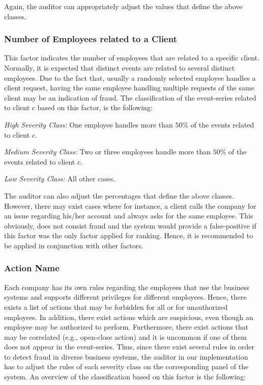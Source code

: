 \documentclass[conference]{IEEEtran}
\begin{document}
Again, the auditor can appropriately adjust the values that define
the above classes.

\subsubsection{Number of Employees related to a Client}

This factor indicates the number of employees that are related to a
specific client. Normally, it is expected that distinct events are
related to several distinct employees. Due to the fact that, usually
a randomly selected employee handles a client request, having the
same employee handling multiple requests of the same client may be
an indication of fraud. The classification of the event-series
related to client $c$ based on this factor, is the following:

\emph{High Severity Class:} One employee handles more than $50\%$ of
the events related to client $c$.

\emph{ Medium Severity Class: }Two or three employees handle more
than $50\%$ of the events related to client $c$.

\emph{Low Severity Class:} All other cases.

The auditor can also adjust the percentages that define the above
classes. However, there may exist cases where for instance, a client
calls the company for an issue regarding his/her account and always
asks for the same employee. This obviously, does not consist fraud
and the system would provide a false-positive if this factor was the
only factor applied for ranking. Hence, it is recommended to be
applied in conjunction with other factors.


\subsubsection{Action Name}

Each company has its own rules regarding the employees that use the
business systems and supports different privileges for different
employees. Hence, there exists a list of actions that may be
forbidden for all or for unauthorized employees. In addition, there
exist actions which are suspicious, even though an employee may be
authorized to perform. Furthermore, there exist actions that may be
correlated (e.g., open-close action) and it is uncommon if one of
them does not appear in the event-series. Thus, since there exist
several rules in order to detect fraud in diverse business systems,
the auditor in our implementation has to adjust the rules of each
severity class on the corresponding panel of the system. An overview
of the classification based on this factor is the following:
\end{document}
